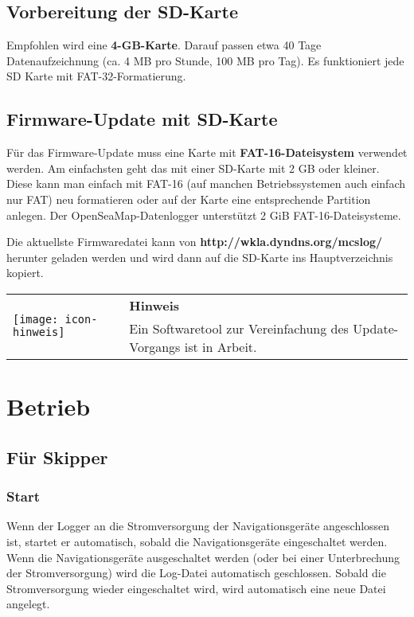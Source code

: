 \documentclass[pdftex, 8pt, paper=130mm:92mm,pagesize]{scrartcl}
\let\stdsection\section
\renewcommand\section{\newpage\stdsection}
\newlength{\iconwidth}
\newenvironment{displaybox}[2]{%
  \begin{center}
    \setlength\arrayrulewidth{0.75pt}%
    \arrayrulecolor{white}%
    \renewcommand{\arraystretch}{1.3}%
    \begin{tabular}{p{\iconwidth}p{\linewidth-4\tabcolsep-\iconwidth}}
      \multirow{2}{*}{#2}&\cellcolor{boxheadcol}\textbf{\color{white}#1} \\%
      \hhline{~-}%
      &\cellcolor{boxcol}%
}{%
      \\
    \end{tabular}
  \end{center}%
\arrayrulecolor{black}
}
\newenvironment{Hinweis}{%
\begin{displaybox}{Hinweis}{\texttt{[image: icon-hinweis]}}}%
{\end{displaybox}}
\begin{document}
\subsection{Vorbereitung der SD-Karte}

Empfohlen wird eine \textbf{4-GB-Karte}. Darauf passen etwa 40 Tage Datenaufzeichnung (ca. 4 MB pro Stunde, 100 MB pro Tag). Es funktioniert jede SD Karte mit FAT-32-Formatierung. 

\subsection{Firmware-Update mit SD-Karte}\label{sec:firmware}

Für das Firmware-Update muss eine Karte mit \textbf{FAT-16-Dateisystem} verwendet werden. Am einfachsten geht das mit einer SD-Karte mit 2 GB oder kleiner. Diese kann man einfach mit FAT-16 (auf manchen Betriebssystemen auch einfach nur FAT) neu formatieren oder auf der Karte eine entsprechende Partition anlegen. Der OpenSeaMap-Datenlogger unterstützt 2 GiB FAT-16-Dateisysteme. 

Die aktuellste Firmwaredatei kann von \textbf{http://wkla.dyndns.org/mcslog/} herunter geladen werden und wird dann auf die SD-Karte ins Hauptverzeichnis kopiert. 

\begin{Hinweis}
Ein Softwaretool zur Vereinfachung des Update-Vorgangs ist in Arbeit. 
\end{Hinweis}

\section{Betrieb}

\subsection{Für Skipper}

\subsubsection{Start}

Wenn der Logger an die Stromversorgung der Navigationsgeräte angeschlossen ist, startet er automatisch, sobald die Navigationsgeräte eingeschaltet werden. Wenn die Navigationsgeräte ausgeschaltet werden (oder bei einer Unterbrechung der Stromversorgung) wird die Log-Datei automatisch geschlossen. Sobald die Stromversorgung wieder eingeschaltet wird, wird automatisch eine neue Datei angelegt. 
\end{document}
